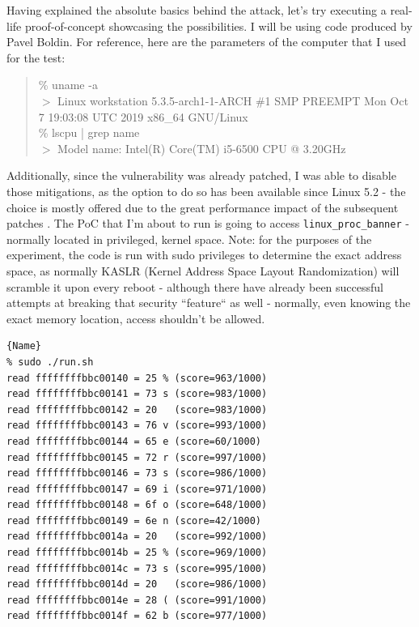 \documentclass{article}
\begin{document}
Having explained the absolute basics behind the attack, let's try executing a real-life proof-of-concept showcasing the possibilities. I will be using code produced by Pavel Boldin\cite{MeltdownPOC}. For reference, here are the parameters of the computer that I used for the test:

\begin{quote}
\% uname -a 
\\ $>$ Linux workstation 5.3.5-arch1-1-ARCH \#1 SMP PREEMPT Mon Oct 7 19:03:08 UTC 2019 x86\_64 GNU/Linux 
\\ \% lscpu | grep name
\\ $>$ Model name: Intel(R) Core(TM) i5-6500 CPU @ 3.20GHz
\end{quote}

Additionally, since the vulnerability was already patched, I was able to disable those mitigations, as the option to do so has been available since Linux 5.2 - the choice is mostly offered due to the great performance impact of the subsequent patches \cite{low2018overview}. The PoC that I'm about to run is going to access \lstinline{linux_proc_banner} - normally located in privileged, kernel space. Note: for the purposes of the experiment, the code is run with sudo privileges to determine the exact address space, as normally KASLR (Kernel Address Space Layout Randomization) will scramble it upon every reboot - although there have already been successful attempts at breaking that security ``feature`` as well \cite{jang2016breaking} - normally, even knowing the exact memory location, access shouldn't be allowed. 

\pagebreak

\begin{lstlisting}[caption=Meltdown in action, frame=tlrb, breaklines=true]{Name}
% sudo ./run.sh          
read ffffffffbbc00140 = 25 % (score=963/1000)
read ffffffffbbc00141 = 73 s (score=983/1000)
read ffffffffbbc00142 = 20   (score=983/1000)
read ffffffffbbc00143 = 76 v (score=993/1000)
read ffffffffbbc00144 = 65 e (score=60/1000)
read ffffffffbbc00145 = 72 r (score=997/1000)
read ffffffffbbc00146 = 73 s (score=986/1000)
read ffffffffbbc00147 = 69 i (score=971/1000)
read ffffffffbbc00148 = 6f o (score=648/1000)
read ffffffffbbc00149 = 6e n (score=42/1000)
read ffffffffbbc0014a = 20   (score=992/1000)
read ffffffffbbc0014b = 25 % (score=969/1000)
read ffffffffbbc0014c = 73 s (score=995/1000)
read ffffffffbbc0014d = 20   (score=986/1000)
read ffffffffbbc0014e = 28 ( (score=991/1000)
read ffffffffbbc0014f = 62 b (score=977/1000)
\end{lstlisting}
\end{document}
